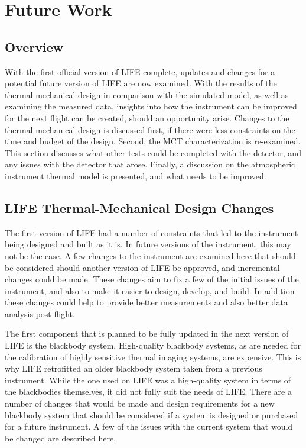 \chapter{Future Work} \label{future}

\section{Overview}
With the first official version of LIFE complete, updates and changes for a potential future version of LIFE are now examined. With the results of the thermal-mechanical design in comparison with the simulated model, as well as examining the measured data, insights into how the instrument can be improved for the next flight can be created, should an opportunity arise. Changes to the thermal-mechanical design is discussed first, if there were less constraints on the time and budget of the design. Second, the MCT characterization is re-examined. This section discusses what other tests could be completed with the detector, and any issues with the detector that arose. Finally, a discussion on the atmospheric instrument thermal model is presented, and what needs to be improved. 

\section{LIFE Thermal-Mechanical Design Changes}
The first version of LIFE had a number of constraints that led to the instrument being designed and built as it is. In future versions of the instrument, this may not be the case. A few changes to the instrument are examined here that should be considered should another version of LIFE be approved, and incremental changes could be made. These changes aim to fix a few of the initial issues of the instrument, and also to make it easier to design, develop, and build. In addition these changes could help to provide better measurements and also better data analysis post-flight.

The first component that is planned to be fully updated in the next version of LIFE is the blackbody system. High-quality blackbody systems, as are needed for the calibration of highly sensitive thermal imaging systems, are expensive. This is why LIFE retrofitted an older blackbody system taken from a previous instrument. While the one used on LIFE was a high-quality system in terms of the blackbodies themselves, it did not fully suit the needs of LIFE. There are a number of changes that would be made and design requirements for a new blackbody system that should be considered if a system is designed or purchased for a future instrument. A few of the issues with the current system that would be changed are described here.

